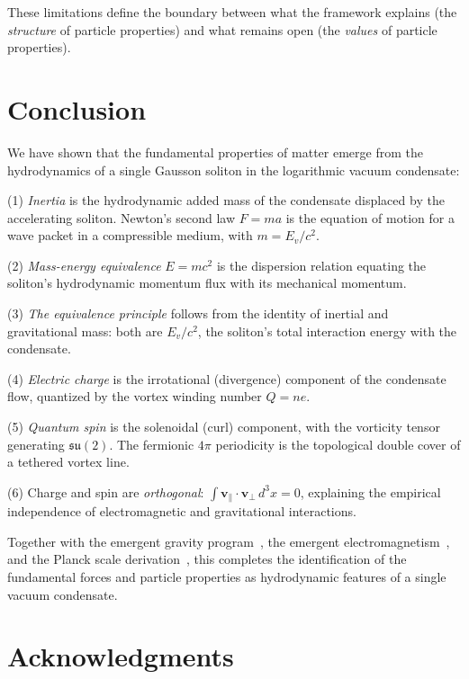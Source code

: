 \documentclass[12pt, a4paper]{article}
\begin{document}
These limitations define the boundary between what
the framework explains (the \emph{structure} of
particle properties) and what remains open (the
\emph{values} of particle properties).


\section{Conclusion}
\label{sec:conclusion}

We have shown that the fundamental properties of
matter emerge from the hydrodynamics of a single
Gausson soliton in the logarithmic vacuum condensate:

(1) \emph{Inertia} is the hydrodynamic added mass of
the condensate displaced by the accelerating soliton.
Newton's second law $F = ma$ is the equation of
motion for a wave packet in a compressible medium,
with $m = E_v/c^2$.

(2) \emph{Mass-energy equivalence} $E = mc^2$ is the
dispersion relation equating the soliton's
hydrodynamic momentum flux with its mechanical
momentum.

(3) \emph{The equivalence principle} follows from the
identity of inertial and gravitational mass: both are
$E_v/c^2$, the soliton's total interaction energy
with the condensate.

(4) \emph{Electric charge} is the irrotational
(divergence) component of the condensate flow,
quantized by the vortex winding number $Q = ne$.

(5) \emph{Quantum spin} is the solenoidal (curl)
component, with the vorticity tensor generating
$\mathfrak{su}(2)$. The fermionic $4\pi$ periodicity
is the topological double cover of a tethered vortex
line.

(6) Charge and spin are \emph{orthogonal}:
$\int\mathbf{v}_\parallel\cdot\mathbf{v}_\perp\,
d^3x = 0$, explaining the empirical independence of
electromagnetic and gravitational interactions.

Together with the emergent gravity
program~\cite{kulangiev_gravity}, the emergent
electromagnetism~\cite{kulangiev_maxwell}, and the
Planck scale derivation~\cite{kulangiev_planck},
this completes the identification of the fundamental
forces and particle properties as hydrodynamic
features of a single vacuum condensate.


\section*{Acknowledgments}
\end{document}
